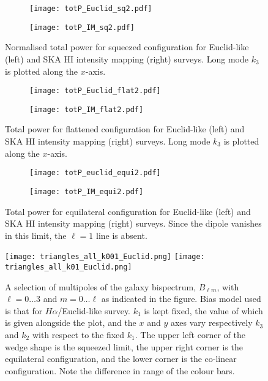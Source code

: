 {\clearpage
\begin{figure}[H]
\begin{subfigure}{0.5\textwidth}
\texttt{[image: totP\_Euclid\_sq2.pdf]}
\end{subfigure}%
\begin{subfigure}{0.5\textwidth}
\texttt{[image: totP\_IM\_sq2.pdf]}
\end{subfigure}
\caption{Normalised total power for squeezed configuration for Euclid-like (left) and SKA HI intensity mapping (right) surveys. Long mode \(k_3\) is plotted along the \(x\)-axis. \label{fig:totpowersq}}
\end{figure}
\begin{figure}[H]
\begin{subfigure}{0.5\textwidth}
\texttt{[image: totP\_Euclid\_flat2.pdf]}
\end{subfigure}%
\begin{subfigure}{0.5\textwidth}
\texttt{[image: totP\_IM\_flat2.pdf]}
\end{subfigure}
\caption{Total power for flattened configuration for Euclid-like (left) and SKA HI intensity mapping (right) surveys. Long mode \(k_3\) is plotted along the \(x\)-axis. \label{fig:totpowerfl}}
\end{figure}
\begin{figure}[H]
\begin{subfigure}{0.5\textwidth}
\texttt{[image: totP\_euclid\_equi2.pdf]}
\end{subfigure}%
\begin{subfigure}{0.5\textwidth}
\texttt{[image: totP\_IM\_equi2.pdf]}
\end{subfigure}
\caption{Total power for equilateral configuration for Euclid-like (left) and SKA HI intensity mapping (right) surveys. Since the dipole vanishes in this limit, the \(\ell = 1\) line is absent.\label{fig:totpowereq}}
\end{figure}


\clearpage
\begin{figure}[H]
\centering
    \texttt{[image: triangles\_all\_k001\_Euclid.png]}
	\texttt{[image: triangles\_all\_k01\_Euclid.png]}
	\caption{A selection of multipoles of the galaxy bispectrum, \(B_{\ell m}\), with \(\ell = 0 \ldots 3\) and \(m = 0 \ldots \ell\) as indicated in the figure. Bias model used is that for \(H\alpha\)/Euclid-like survey. \(k_1\) is kept fixed, the value of which is given alongside the plot, and the \(x\) and \(y\) axes vary respectively \(k_3\) and \(k_2\) with respect to the fixed \(k_1\). The upper left corner of the wedge shape is the squeezed limit, the upper right corner is the equilateral configuration, and the lower corner is the co-linear configuration. Note the difference in range of the colour bars.}
		\label{fig:euclidtriangle}
\end{figure}

}
